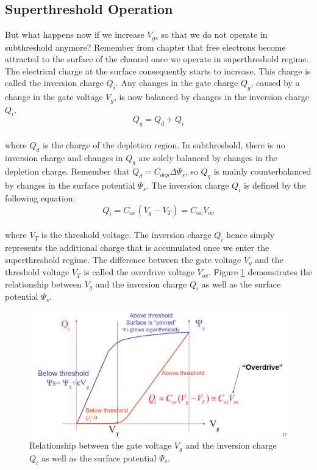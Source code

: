 \subsection{Superthreshold Operation}

But what happens now if we increase $V_{gs}$ so that we do not operate in subthreshold anymore? Remember from chapter that free electrons become attracted to the surface of the channel once we operate in superthreshold regime. The electrical charge at the surface consequently starts to increase. This charge is called the inversion charge $Q_i$. Any changes in the gate charge $Q_g$, caused by a change in the gate voltage $V_g$, is now balanced by changes in the inversion charge $Q_i$.\\

\begin{equation}
    Q_g = Q_d + Q_i
\end{equation}\\

where $Q_d$ is the charge of the depletion region. In subthreshold, there is no inversion charge and changes in $Q_g$ are solely balanced by changes in the depletion charge. Remember that $Q_d = C_{dep} \Delta \Psi_s$, so $Q_g$ is mainly counterbalanced by changes in the surface potential $\Psi_s$. The inversion charge $Q_i$ is defined by the following equation:\\

\begin{equation}
    Q_i = C_{ox} (V_g - V_T) = C_{ox} V_{ov}
\end{equation}\\

where $V_T$ is the threshold voltage. The inversion charge $Q_i$ hence simply represents the additional charge that is accumulated once we enter the superthreshold regime. The difference between the gate voltage $V_g$ and the threshold voltage $V_T$ is called the overdrive voltage $V_{ov}$. Figure \ref{fig:vg_vs_qi} demonstrates the relationship between $V_g$ and the inversion charge $Q_i$ as well as the surface potential $\Psi_s$.\\

\begin{figure}
    \centering
    \includegraphics[width=\linewidth]{Figures/Vg_vs_Qi.PNG}
    \caption{Relationship between the gate voltage $V_g$ and the inversion charge $Q_i$ as well as the surface potential $\Psi_s$.}
    \label{fig:vg_vs_qi}
\end{figure}

